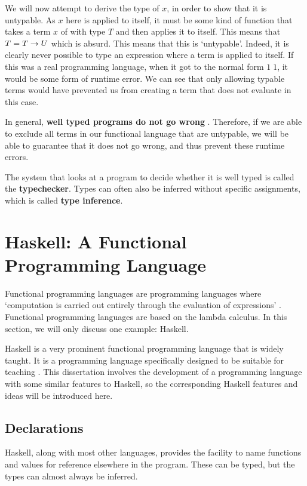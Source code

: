 We will now attempt to derive the type of $x$, in order to show that it is untypable.
As $x$ here is applied to itself, it must be some kind of function that takes a term $x$ of with type $T$ and then applies it to itself. This means that $T = T \rightarrow U$ which is absurd. This means that this is `untypable'. Indeed, it is clearly never possible to type an expression where a term is applied to itself. If this was a real programming language, when it got to the normal form \(1\;1\), it would be some form of runtime error. We can see that only allowing typable terms would have prevented us from creating a term that does not evaluate in this case. 

In general, \textbf{well typed programs do not go wrong} \cite{MILNER1978348}. Therefore, if we are able to exclude all terms in our functional language that are untypable, we will be able to guarantee that it does not go wrong, and thus prevent these runtime errors. 

The system that looks at a program to decide whether it is well typed is called the \textbf{typechecker}. Types can often also be inferred without specific assignments, which is called \textbf{type inference}.

\section{Haskell: A Functional Programming Language}
Functional programming languages are programming languages where `computation is carried out entirely through the evaluation of expressions' \cite{hudak1989conceptionfunctionalprogranning}. Functional programming languages are based on the lambda calculus. In this section, we will only discuss one example: Haskell. 

Haskell is a very prominent functional programming language that is widely taught. It is a programming language specifically designed to be suitable for teaching \cite{hudak2007history}. This dissertation involves the development of a programming language with some similar features to Haskell, so the corresponding Haskell features and ideas will be introduced here. 

\subsection{Declarations}
Haskell, along with most other languages, provides the facility to name functions and values for reference elsewhere in the program. These can be typed, but the types can almost always be inferred. 

